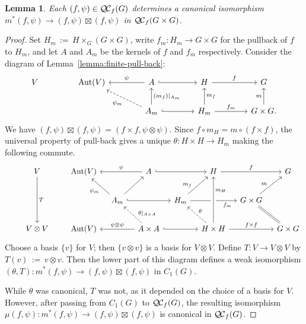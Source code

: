 \documentclass[11pt]{amsart}
\theoremstyle{plain}
\newtheorem{lemma}[theorem]{Lemma}
\theoremstyle{definition}
\theoremstyle{remark}
\DeclareMathOperator{\Aut}{Aut}
\newcommand{\ceq}{{\, :=\, }}
\newcommand{\QC}{{\mathcal{Q\hskip-0.8pt C}}}
\newcommand{\QCf}{{\QC_f}}
\begin{document}
\begin{lemma}\label{lemma:finite-iso}
Each $(f,\psi)\in \QCf(G)$ determines a canonical isomorphism $m^*(f,\psi) \to (f,\psi)\boxtimes(f,\psi)$ in $\QCf(G\times G)$.
 \end{lemma}

\begin{proof}
Set $H_m \ceq H\times_G(G\times G)$, write $f_m : H_m \to G \times G$ for the pullback of $f$ to $H_m$, and let $A$ and $A_m$ be the kernels of $f$ and $f_m$ respectively.  Consider the diagram of Lemma~\ref{lemma:finite-pull-back}:
\[
\begin{tikzcd}[column sep=40]
V & \Aut(V) & \arrow[swap]{l}{\psi} A \arrow[hook]{r} & H \arrow{r}{f} &  G\\
  &  & \arrow[dashed]{ul}{\psi_m} \arrow[swap]{u}{(m_f)\vert_{A_m}} A_m \arrow[hook]{r}
  & \arrow[swap]{u}{m_f} H_m \arrow{r}{f_m} & \arrow{u}{m} G\times G.
\end{tikzcd}
\]
We have $(f,\psi) \boxtimes (f,\psi) = (f\times f, \psi\otimes \psi)$.
Since $f\circ m_H = m \circ (f\times f)$, the universal property of pull-back gives
a unique $\theta : H\times H \to H_m$ making the following commute.
\[
\begin{tikzcd}[row sep=20,column sep=10]
\ & V \arrow{dd}{T} && \Aut(V) && A \arrow[hook]{rr} \arrow[swap]{ll}{\psi} &&  H \arrow{rr}{f} && G\\
 && && \arrow{ul}{\psi_m} A_m  \arrow[hook]{rr} \arrow{ur} && H_m \arrow[pos=0.3]{ur}{m_f} \arrow[swap, pos=0.8]{rr}{f_m}
 && G \times G \arrow[equal]{dr} \arrow[pos=0.42]{ur}{m} & \\
& V\otimes V && \Aut(V) && \arrow[swap]{ll}{\psi \otimes \psi} \arrow[dashed,swap,pos=0.3]{ul}{\theta\vert_{A\times A}} A\times A \arrow[hook]{rr}
&& \arrow[dashed,swap]{ul}{\theta} \arrow[crossing over,swap,pos=0.7]{uu}{m_H} H\times H \arrow{rr}{f\times f} && G\times G
\end{tikzcd}
\]
Choose a basis $\{ v \}$ for $V$; then $\{ v\otimes v \}$ is a basis for $V\otimes V$.
Define $T : V \to V\otimes V$ by $T(v) \ceq v\otimes v$. Then the lower part of this
diagram defines a weak isomorphism $(\theta,T): m^*(f,\psi) \to (f,\psi)\boxtimes (f,\psi)$  in $C_1(G)$. 

While $\theta$ was canonical, $T$ was not, as it depended on the choice of a basis for $V$.
However, after passing from $C_1(G)$ to $\QCf(G)$, the resulting isomorphism
$\mu(f,\psi): m^*(f,\psi) \to (f,\psi)\boxtimes (f,\psi)$ is canonical in $\QCf(G)$.
\end{proof}
\end{document}
